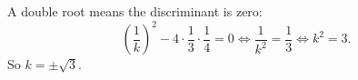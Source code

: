 A double root means the discriminant is zero:
\[
\left(\dfrac{1}{k}\right)^2-4\cdot\dfrac{1}{3}\cdot\dfrac{1}{4}=0\iff\dfrac{1}{k^2}=\dfrac{1}{3}\iff k^2=3 .
\]
So $k=\boxed{\pm\sqrt3}$.
